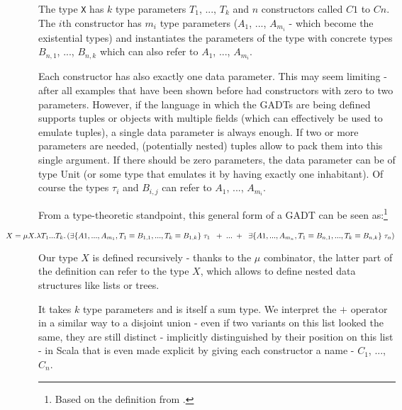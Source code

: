 The type \texttt{X} has $k$ type parameters $T_1$, ..., $T_k$ and $n$ constructors called $C1$ to $Cn$. The $i$th constructor has $m_i$ type parameters ($A_1$, ..., $A_{m_i}$ - which become the existential types) and instantiates the parameters of the type with concrete types $B_{n, 1}$, ..., $B_{n, k}$ which can also refer to $A_1$, ..., $A_{m_i}$. 

Each constructor has also exactly one data parameter. This may seem limiting - after all examples that have been shown before had constructors with zero to two parameters. However, if the language in which the GADTs are being defined supports tuples or objects with multiple fields (which can effectively be used to emulate tuples), a single data parameter is always enough. If two or more parameters are needed, (potentially nested) tuples allow to pack them into this single argument. If there should be zero parameters, the data parameter can be of type Unit (or some type that emulates it by having exactly one inhabitant). Of course the types $\tau_{i}$ and $B_{i, j}$ can refer to $A_1$, ..., $A_{m_i}$.




From a type-theoretic standpoint, this general form of a GADT can be seen as:\footnote{Based on the definition from \cite{XiGRDT}.}

\[
\hspace*{-1.5cm}
X = \mu X. \lambda T_1 ... T_k. \left(\exists \{ A1, ..., A_{m_1}, T_1 \equiv B_{1,1}, ..., T_k \equiv B_{1,k} \} \; \tau_1 \;\; + \; ... \; + \;\; \exists \{ A1, ..., A_{m_n}, T_1 \equiv B_{n,1}, ..., T_k \equiv B_{n,k} \} \; \tau_n\right)
\]


Our type $X$ is defined recursively - thanks to the $\mu$ combinator, the latter part of the definition can refer to the type $X$, which allows to define nested data structures like lists or trees.

It takes $k$ type parameters and is itself a sum type. We interpret the $+$ operator in a similar way to a disjoint union - even if two variants on this list looked the same, they are still distinct - implicitly distinguished by their position on this list - in Scala that is even made explicit by giving each constructor a name - $C_1$, ..., $C_n$.

